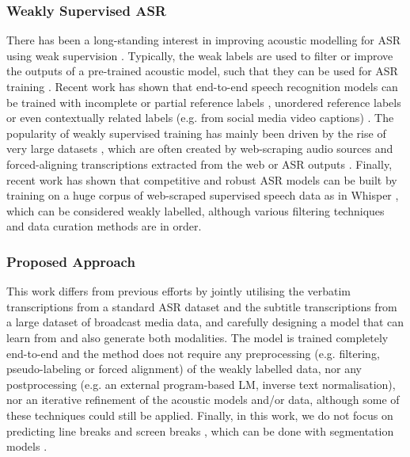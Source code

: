 \subsubsection{Weakly Supervised ASR}
\noindent There has been a long-standing interest in improving acoustic modelling for ASR using weak supervision \cite{li2017, li2019, lamel_2002}. Typically, the weak labels are used to filter or improve the outputs of a pre-trained acoustic model, such that they can be used for ASR training \cite{lamel_2002}. Recent work has shown that end-to-end speech recognition models can be trained with incomplete or partial reference labels \cite{pratap2022_neurips}, unordered reference labels \cite{pratap2022_icassp} or even contextually related labels (e.g. from social media video captions) \cite{sing2020_icassp}. The popularity of weakly supervised training has mainly been driven by the rise of very large datasets \cite{chen21o_interspeech}, which are often created by web-scraping audio sources and forced-aligning transcriptions extracted from the web or ASR outputs \cite{wenetspeech, galvez2021peoples, reazonspeech}. Finally, recent work has shown that competitive and robust ASR models can be built by training on a huge corpus of web-scraped supervised speech data as in Whisper \cite{whisper}, which can be considered weakly labelled, although various filtering techniques and data curation methods are in order.

\subsubsection{Proposed Approach}
\noindent This work differs from previous efforts by jointly utilising the verbatim transcriptions from a standard ASR dataset and the subtitle transcriptions from a large dataset of broadcast media data, and carefully designing a model that can learn from and also generate both modalities. The model is trained completely end-to-end and the method does not require any preprocessing (e.g. filtering, pseudo-labeling or forced alignment) of the weakly labelled data, nor any postprocessing (e.g. an external program-based LM, inverse text normalisation), nor an iterative refinement of the acoustic models and/or data, although some of these techniques could still be applied. Finally, in this work, we do not focus on predicting line breaks and screen breaks \cite{wilken-etal-2022-suber}, which can be done with segmentation models \cite{karakanta-etal-2022-evaluating}.